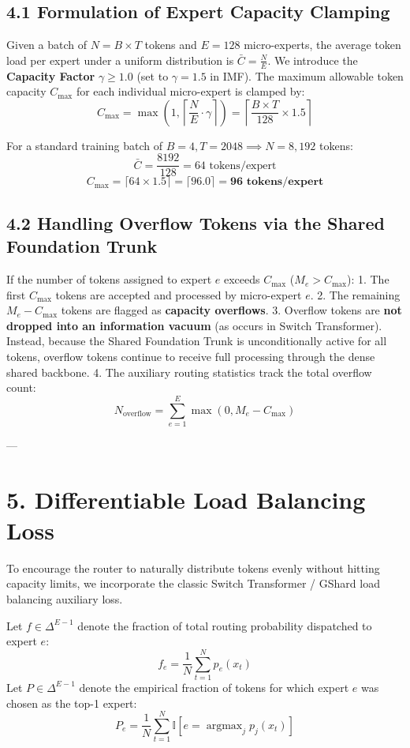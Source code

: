\documentclass[11pt,twoside,openright]{amsbook}
\begin{document}
{{{{{{{{{{\subsection{4.1 Formulation of Expert Capacity Clamping}

Given a batch of $N = B \times T$ tokens and $E = 128$ micro-experts, the average token load per expert under a uniform distribution is $\bar{C} = \frac{N}{E}$.
We introduce the \textbf{Capacity Factor} $\gamma \ge 1.0$ (set to $\gamma = 1.5$ in IMF).
The maximum allowable token capacity $C_{\max}$ for each individual micro-expert is clamped by:
$$C_{\max} = \max\left(1, \left\lceil \frac{N}{E} \cdot \gamma \right\rceil\right) = \left\lceil \frac{B \times T}{128} \times 1.5 \right\rceil$$

For a standard training batch of $B = 4, T = 2048 \implies N = 8,192$ tokens:
$$\bar{C} = \frac{8192}{128} = 64 \text{ tokens/expert}$$
$$C_{\max} = \lceil 64 \times 1.5 \rceil = \lceil 96.0 \rceil = \mathbf{96 \text{ tokens/expert}}$$

\subsection{4.2 Handling Overflow Tokens via the Shared Foundation Trunk}

If the number of tokens assigned to expert $e$ exceeds $C_{\max}$ ($M_e > C_{\max}$):
1. The first $C_{\max}$ tokens are accepted and processed by micro-expert $e$.
2. The remaining $M_e - C_{\max}$ tokens are flagged as \textbf{capacity overflows}.
3. Overflow tokens are \textbf{not dropped into an information vacuum} (as occurs in Switch Transformer). Instead, because the Shared Foundation Trunk is unconditionally active for all tokens, overflow tokens continue to receive full processing through the dense shared backbone.
4. The auxiliary routing statistics track the total overflow count:
   $$N_{\text{overflow}} = \sum_{e=1}^E \max(0, M_e - C_{\max})$$

---

\section{5. Differentiable Load Balancing Loss}

To encourage the router to naturally distribute tokens evenly without hitting capacity limits, we incorporate the classic Switch Transformer / GShard load balancing auxiliary loss.

Let $f \in \Delta^{E-1}$ denote the fraction of total routing probability dispatched to expert $e$:
$$f_e = \frac{1}{N} \sum_{t=1}^N p_e(x_t)$$
Let $P \in \Delta^{E-1}$ denote the empirical fraction of tokens for which expert $e$ was chosen as the top-1 expert:
$$P_e = \frac{1}{N} \sum_{t=1}^N \mathbb{I}[e = \operatorname{argmax}_j p_j(x_t)]$$

}}}}}}}}}}
\end{document}
